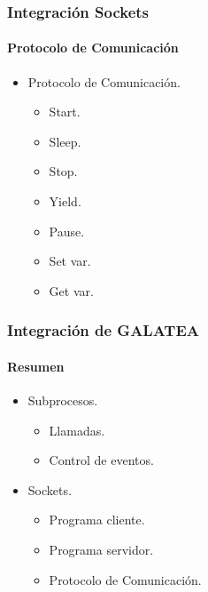 \documentclass[spanish,xcolor=dvipsnames]{beamer}
\begin{document}
    \begin{frame}
    	\frametitle{Integración Sockets}
    	\framesubtitle{Protocolo de Comunicación}
    	
    	\begin{itemize}
    		\item Protocolo de Comunicación.
    		\begin{itemize}
    			\item Start.
    			\item Sleep.
    			\item Stop.
    			\item Yield.
    			\item Pause.
    			\item Set var.
    			\item Get var.
    		\end{itemize}
    	\end{itemize}
    \end{frame}
    \begin{frame}
    	\frametitle{Integración de GALATEA}
    	\framesubtitle{Resumen}
    	
    	\begin{itemize}
    		\item Subprocesos.
    		\begin{itemize}
    			\item Llamadas.
    			\item Control de eventos.
    		\end{itemize}
    		\item Sockets.
    		\begin{itemize}
    			\item Programa cliente.
    			\item Programa servidor.
    			\item Protocolo de Comunicación.
    		\end{itemize}
    	\end{itemize}
    	
    \end{frame}

\end{document}
